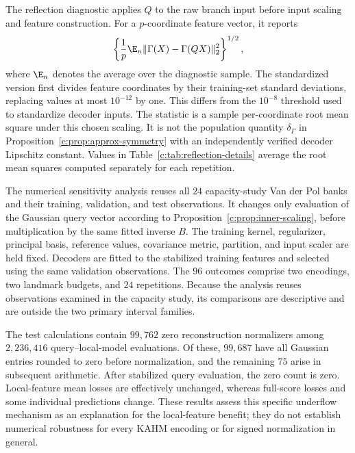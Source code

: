 The reflection diagnostic applies $Q$ to the raw branch input before
input scaling and feature construction. For a $p$-coordinate feature
vector, it reports
\[
 \left\{\frac1p\E_n\|\Gamma(X)-\Gamma(QX)\|_2^2\right\}^{1/2},
\]
where $\E_n$ denotes the average over the diagnostic sample. The
standardized version first divides feature coordinates by their
training-set standard deviations, replacing values at most $10^{-12}$
by one. This differs from the $10^{-8}$ threshold used to standardize
decoder inputs. The statistic is a sample per-coordinate root mean
square under this chosen scaling. It is not the population quantity
$\delta_\Gamma$ in Proposition~\ref{c:prop:approx-symmetry} with an
independently verified decoder Lipschitz constant. Values in
Table~\ref{c:tab:reflection-details} average the root mean squares
computed separately for each repetition.

The numerical sensitivity analysis reuses all $24$ capacity-study
Van der Pol banks and their training, validation, and test observations.
It changes only evaluation of the Gaussian query vector according to
Proposition~\ref{c:prop:inner-scaling}, before multiplication by the
same fitted inverse $B$. The training kernel, regularizer, principal
basis, reference values, covariance metric, partition, and input
scaler are held fixed. Decoders are fitted to the stabilized training
features and selected using the same validation observations.
The $96$ outcomes comprise two encodings, two landmark budgets, and
$24$ repetitions. Because the analysis reuses observations examined
in the capacity study, its comparisons are descriptive and are outside
the two primary interval families.

The test calculations contain $99{,}762$ zero reconstruction
normalizers among $2{,}236{,}416$ query--local-model evaluations.
Of these, $99{,}687$ have all Gaussian entries rounded to zero before
normalization, and the remaining $75$ arise in subsequent arithmetic.
After stabilized query evaluation, the zero count is zero. Local-feature
mean losses are effectively unchanged, whereas full-score losses and
some individual predictions change. These results assess this specific
underflow mechanism as an explanation for the local-feature benefit;
they do not establish numerical robustness for every KAHM encoding or
for signed normalization in general.


